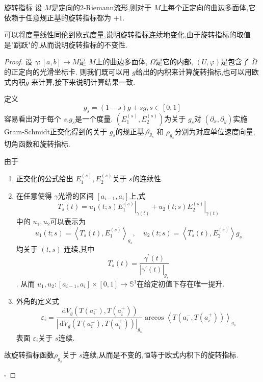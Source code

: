 \documentclass[../../main.tex]{subfiles}
\begin{document}
\begin{lemma}{旋转指标}
    设 \(  M  \)是定向的2-Riemann流形,则对于 \(  M  \)上每个正定向的曲边多面体,它依赖于任意规正基的旋转指标都为 \(  + 1  \).       
\end{lemma}

\begin{note}
    可以将度量线性同伦到欧式度量,说明旋转指标连续地变化,由于旋转指标的取值是"跳跃"的,从而说明旋转指标的不变性.
\end{note}

\begin{proof}
    设 \(   \gamma :\left[ a,b \right]\to M   \)是 \(  M  \)上的曲边多面体, \(   \Omega   \)是它的内部, \(  \left( U, \varphi  \right)   \)是包含了 \(  \overline{ \Omega }  \)的正定向的光滑坐标卡.   则我们既可以用 \(  g  \)给出的内积来计算旋转指标,也可以用欧式内积\(  \bar{g}  \) 来计算,接下来说明计算结果一致.
    
    定义 \[
    g_{s}= \left( 1-s \right)g+ s \bar{g}, s \in \left[ 0,1 \right] 
    \] 容易看出对于每个 \(  s  \),\(  g_{s}  \)是一个度量.  \(  \left( E_1^{\left( s \right) },E_2^{\left( s \right) } \right)   \)为关于 \(  g_{s}  \)对 \(  \left(  \partial _{x}, \partial _{y} \right)   \)实施Gram-Schmidt正交化得到的关于 \(  g_{s}  \)的规正基,\(  \theta _{g_{s}}  \)     和 \(  \rho _{g_{s}}  \)分别为对应单位速度向量,切角函数和旋转指标. 

    由于
    \begin{enumerate}
        \item 正交化的公式给出 \(  E_1^{\left( s \right) },E_2^{\left( s \right) }  \)关于  \(  s  \)的连续性.
        \item 在任意使得 \(   \gamma   \)光滑的区间 \(  \left[ a_{i-1},a_{i} \right]   \)上,式   \[
        T_{s}\left( t \right) = u_1\left( t;s \right)\left. E_1^{\left( s \right) } \right|_{ \gamma \left( t \right) }+ u_2\left( t;s \right)\left. E_2^{\left( s \right) } \right|_{ \gamma \left( t \right) }  
        \] 中的 \(  u_1,u_2  \)可以表示为 \[
        u_1\left( t;s \right)= \left<T_{s}\left( t \right),E_1^{\left( s \right) }  \right>_{g_{s}},\quad u_2\left( t;s \right)= \left<T_{s}\left( t \right),E_2^{\left( s \right) }  \right>g_{s}  
        \]均关于  \(  \left( t,s \right)   \) 连续,其中 \[
        T_{s}\left( t \right)= \frac{ \gamma ^{\prime} \left( t \right)  }{\left|  \gamma ^{\prime} \left( t \right)  \right|_{g_{s}}  }  
        \].  从而 \(  u_1,u_2:\left[ a_{i-1},a_{i} \right]\times \left[ 0,1 \right]\to \mathbb{S}^{1}    \)在给定初值下存在唯一提升.
        \item 外角的定义式 \[
         \varepsilon _{i}= \frac{\,\mathrm{d} V_{g}\left( T\left( a_{i}^{-} \right)  ,T\left( a_{i}^{+ } \right) \right)  }{ \left| \,\mathrm{d} V_{g}\left( T\left( a_{i}^{-} \right),T\left( a_{i}^{+ } \right)   \right)  \right|_{g_{s}} }\arccos \left<T\left( a_{i}^{-},T\left( a_{i}^{+ } \right)  \right)  \right>_{g_{s}} 
        \]表面 \(   \varepsilon _{i}  \)关于 \(  s  \)连续.  
    \end{enumerate}
    故旋转指标函数\(  \rho _{g_{s}}  \)关于 \(  s  \)连续,从而是不变的,恒等于欧式内积下的旋转指标.  

    \hfill $\square$
\end{proof}
\end{document}
